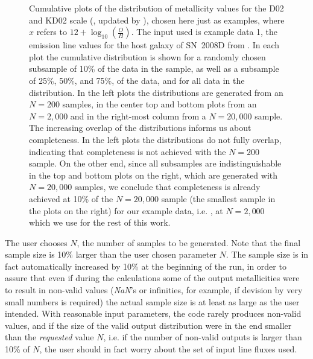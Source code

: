 \documentclass{emulateapj}
\newcommand{\oxab}{\ensuremath{12 + \log_{10}(\frac{O}{H})}}
\begin{document}
\begin{figure}[!ht]
\caption{Cumulative plots of the distribution of metallicity values for the D02 \citep{denicolo02} and KD02 scale (\citealt{kewley02}, updated by \citealt{kewley08}), chosen here just as examples, where $x$ refers to \oxab. The input used is example data 1, the emission line values for the host galaxy of SN~2008D from \citet{modjaz11}. In each plot the cumulative distribution is shown for a randomly chosen subsample of 10\% of the data in the sample, as well as a subsample of 25\%, 50\%, and 75\%, of the data, and for all data in the distribution. In the left plots the distributions are generated from an $N=200$ samples, in the center top and bottom plots from an $N=2,000$  and in the right-most column from a $N=20,000$ sample. The increasing overlap of the distributions informs us about completeness. In the left plots the distributions do not fully overlap, indicating that completeness is not achieved with the $N=200$ sample. On the other end, since all subsamples are indistinguishable in the top and bottom plots on the right, which are generated with $N=20,000$ samples, we conclude that completeness is already achieved at 10\% of the $N=20,000$ sample (the smallest sample in the plots on the right) for our example data, i.e. , at $N=2,000$ which we use for the rest of this work.}
 \label{cd}
\end{figure}

The user chooses $N$, the number of samples to be generated.  Note that the final sample size is 10\% larger than the user chosen parameter $N$. The sample size is in fact automatically increased by 10\% at the beginning of the run, in order to assure that even if during the calculations some of the output metallicities were to result in non-valid values (\emph{NaN}'s or infinities, for example, if devision by very small numbers is required) the actual sample size is at least as large as the user intended. With reasonable input parameters, the code rarely produces non-valid values, and if the size of the valid output distribution were in the end smaller than the \emph{requested} value $N$, i.e. if the number of non-valid outputs is larger than 10\% of $N$, the user should in fact worry about the set of input line fluxes used. 
\end{document}
